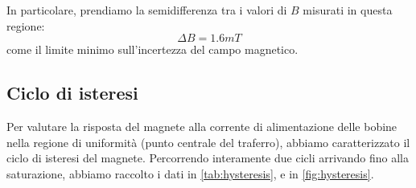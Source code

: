 In particolare, prendiamo la semidifferenza tra i valori di $ B $ misurati in questa regione:
\begin{equation}
\Delta B = 1.6 \unit{mT}
\end{equation}
come il limite minimo sull'incertezza del campo magnetico.

\subsection{Ciclo di isteresi}

Per valutare la risposta del magnete alla corrente di alimentazione delle bobine nella regione di uniformità (punto centrale del traferro), abbiamo caratterizzato il ciclo di isteresi del magnete.
Percorrendo interamente due cicli arrivando fino alla saturazione, abbiamo raccolto i dati in \cref{tab:hysteresis}, e in \cref{fig:hysteresis}.

